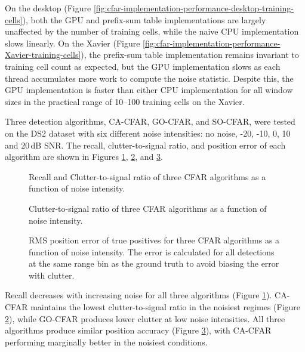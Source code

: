 On the desktop (Figure \ref{fig:cfar-implementation-performance-desktop-training-cells}),
both the GPU and prefix-sum table implementations are largely unaffected by the number of
training cells, while the naive CPU implementation slows linearly. On the Xavier (Figure
\ref{fig:cfar-implementation-performance-Xavier-training-cells}), the prefix-sum table
implementation remains invariant to training cell count as expected, but the GPU
implementation slows as each thread accumulates more work to compute the noise statistic.
Despite this, the GPU implementation is faster than either CPU implementation for all
window sizes in the practical range of 10--100 training cells on the Xavier.

Three detection algorithms, CA-CFAR, GO-CFAR, and SO-CFAR, were tested on the DS2
dataset with six different noise intensities: no noise, -20, -10, 0, 10 and 20\,dB SNR.
The recall, clutter-to-signal ratio, and position error of each algorithm are shown in
Figures \ref{fig:cfar-recall}, \ref{fig:cfar-clutter-to-signal}, and
\ref{fig:cfar-position-error}.

\begin{figure}
    \centering
    \caption[CFAR recall vs noise and algorithm.]{Recall and Clutter-to-signal
    ratio of three CFAR algorithms as a
    function of noise intensity.}
    \label{fig:cfar-recall}
\end{figure}

\begin{figure}
    \centering
    \caption[CFAR clutter to signal ratio vs noise and algorithm.]{Clutter-to-signal ratio
    of three CFAR algorithms as a function of noise intensity.}
    \label{fig:cfar-clutter-to-signal}
\end{figure}

\begin{figure}
    \centering
    \caption[CFAR position error vs noise and algorithm.]{RMS position error of true
    positives for three CFAR algorithms as a function of noise intensity. The 
    error is calculated for all detections at the same range bin as the 
    ground truth to avoid biasing the error with clutter.}
    \label{fig:cfar-position-error}
\end{figure}

Recall decreases with increasing noise for all three algorithms (Figure
\ref{fig:cfar-recall}). CA-CFAR maintains the lowest clutter-to-signal ratio in the
noisiest regimes (Figure \ref{fig:cfar-clutter-to-signal}), while GO-CFAR produces
lower clutter at low noise intensities. All three algorithms produce similar position
accuracy (Figure \ref{fig:cfar-position-error}), with CA-CFAR performing marginally
better in the noisiest conditions.

